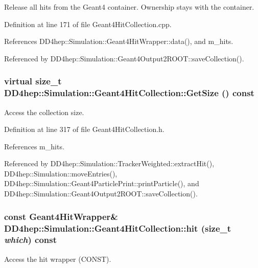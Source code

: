 Release all hits from the Geant4 container. Ownership stays with the container. 

Definition at line 171 of file Geant4HitCollection.cpp.

References DD4hep::Simulation::Geant4HitWrapper::data(), and m\_\-hits.

Referenced by DD4hep::Simulation::Geant4Output2ROOT::saveCollection().\hypertarget{class_d_d4hep_1_1_simulation_1_1_geant4_hit_collection_a0d6716e5834a70694d942deb0a412c2d}{
\subsubsection[{GetSize}]{\setlength{\rightskip}{0pt plus 5cm}virtual size\_\-t DD4hep::Simulation::Geant4HitCollection::GetSize () const}}
\label{class_d_d4hep_1_1_simulation_1_1_geant4_hit_collection_a0d6716e5834a70694d942deb0a412c2d}


Access the collection size. 

Definition at line 317 of file Geant4HitCollection.h.

References m\_\-hits.

Referenced by DD4hep::Simulation::TrackerWeighted::extractHit(), DD4hep::Simulation::moveEntries(), DD4hep::Simulation::Geant4ParticlePrint::printParticle(), and DD4hep::Simulation::Geant4Output2ROOT::saveCollection().\hypertarget{class_d_d4hep_1_1_simulation_1_1_geant4_hit_collection_a50270ebfe8e744e54db874ec5d8ab075}{
\subsubsection[{hit}]{\setlength{\rightskip}{0pt plus 5cm}const {\bf Geant4HitWrapper}\& DD4hep::Simulation::Geant4HitCollection::hit (size\_\-t {\em which}) const}}
\label{class_d_d4hep_1_1_simulation_1_1_geant4_hit_collection_a50270ebfe8e744e54db874ec5d8ab075}


Access the hit wrapper (CONST). 

